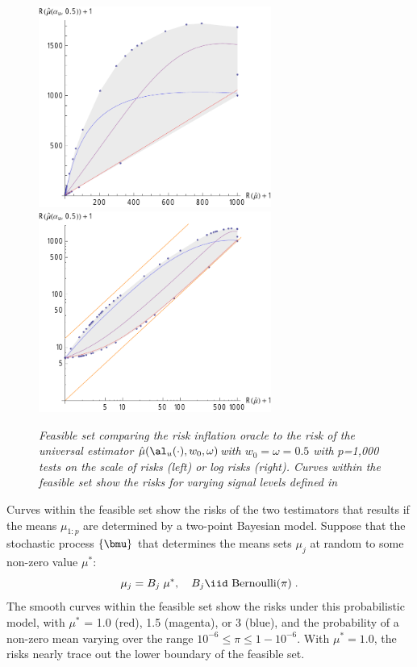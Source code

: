 \documentclass[12pt]{article}
\newcommand{\uTest}{\mbox{$\hat\mu(\al_u(\cdot),w_0,\omega)$}}
\begin{document}
 \begin{figure}
 \caption{ \label{fig:riFeasibleSet} \sl Feasible set comparing the risk
 inflation oracle to the risk of the universal estimator \uTest with
 $w_0=\omega=0.5$ with $p$=1,000 tests on the scale of risks (left) or log risks
 (right).  Curves within the feasible set show the risks for varying signal
 levels defined in }

 \vspace{0.1in}
\centerline{
 \includegraphics[width=3.0in]{figures/riFeasSet}
 \includegraphics[width=3.0in]{figures/riFeasSetLog} }
 \vspace{0.2in}
 \end{figure}


 Curves within the feasible set show the risks of the two testimators that
 results if the means $\mu_{1:p}$ are determined by a two-point Bayesian model.
  Suppose that the stochastic process $\{\bmu\}$ that determines the means sets
 $\mu_j$ at random to some non-zero value $\mu^{*}$:
 \begin{equation}
    \mu_j = B_j \; \mu^{*}, \quad B_j  \iid \mbox{ Bernoulli}(\pi)  \;.
 \label{eq:muj}
 \end{equation}
 The smooth curves within the feasible set show the risks under this
 probabilistic model, with $\mu^{*}$ = 1.0 (red), 1.5 (magenta), or 3 (blue),
 and the probability of a non-zero mean varying over the range $10^{-6} \le \pi
 \le 1-10^{-6}$.  With $\mu^{*} = 1.0$, the risks nearly trace out the lower
 boundary of the feasible set. 
\end{document}

